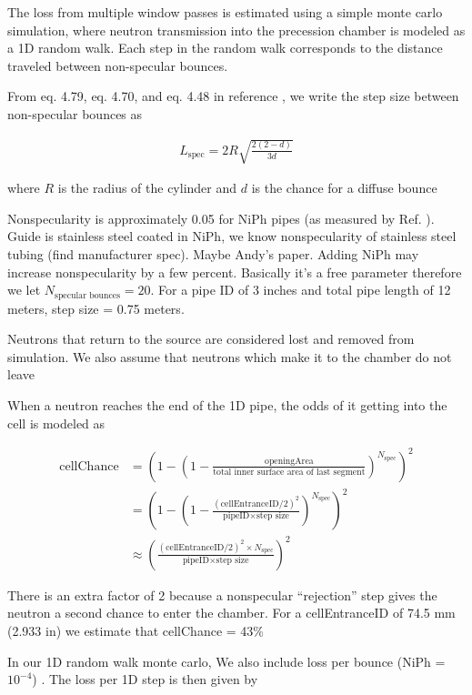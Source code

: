 The loss from multiple window passes is estimated using a simple monte carlo simulation, where neutron transmission into the precession chamber is modeled as a 1D random walk. Each step in the random walk corresponds to the distance traveled between non-specular bounces. 

From eq. 4.79, eq. 4.70, and eq. 4.48 in reference \cite{golubUCN}, we write the step size between non-specular bounces as

\begin{gather}
    L_\text{spec} = 2 R\sqrt{\frac{2(2-d)}{3d} }
\end{gather}


where $R$ is the radius of the cylinder and $d$ is the chance for a diffuse bounce

Nonspecularity is approximately 0.05 for NiPh pipes (as measured by Ref. \cite{pattie_jr_evaluation_2017}). {\color{blue}Guide is stainless steel coated in NiPh, we know nonspecularity of stainless steel tubing (find manufacturer spec). Maybe Andy's paper. Adding NiPh may increase nonspecularity by a few percent. Basically it's a free parameter} therefore we let $N_\text{specular bounces} = 20$. For a pipe ID of 3 inches and total pipe length of 12 meters, step size = 0.75 meters.

Neutrons that return to the source are considered lost and removed from simulation. We also assume that neutrons which make it to the chamber do not leave

When a neutron reaches the end of the 1D pipe, the odds of it getting into the cell is modeled as

\begin{align}
    \text{cellChance} &= \left(1 - \left( 1 - \frac{ \text{openingArea} } {\text{total inner surface area of last segment}} \right) ^ {N_\text{spec}} \right)^2 \\
    &= \left(1 - \left( 1 - \frac{ (\text{cellEntranceID}/2)^{2} } {\text{pipeID}\times\text{step size}} \right) ^ {N_\text{spec}} \right) ^2 \\
    &\approx \left( \frac{ (\text{cellEntranceID}/2)^{2} \times N_\text{spec} } {\text{pipeID}\times\text{step size}} \right)^2
\end{align}

There is an extra factor of 2 because a nonspecular ``rejection'' step gives the neutron a second chance to enter the chamber. For a cellEntranceID of 74.5 mm (2.933 in) we estimate that cellChance = 43\%

In our 1D random walk monte carlo, We also include loss per bounce (NiPh = $10^{-4}$) \cite{pattie_jr_evaluation_2017}. The loss per 1D step is then given by

